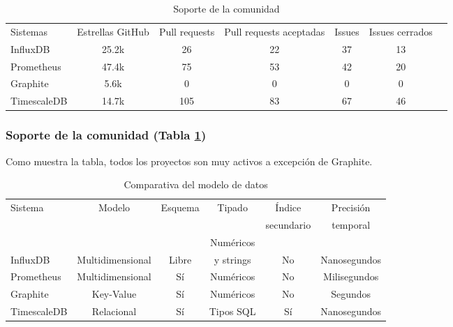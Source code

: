 \begin{table}[H]
    \begin{center}
        \begin{adjustbox}{max width=\textwidth}
            \begin{tabular}{l c c c c c c}
                \toprule
                Sistemas & Estrellas GitHub & Pull requests & Pull requests aceptadas & Issues & Issues cerrados \\
                \otoprule
                InfluxDB    & 25.2k & 26 & 22 & 37 & 13 \\
                Prometheus  & 47.4k & 75 & 53 & 42 & 20\\
                Graphite & 5.6k & 0 & 0 & 0 & 0 \\
                TimescaleDB & 14.7k & 105 & 83 & 67 & 46 \\
                \bottomrule
            \end{tabular}
        \end{adjustbox}
        \caption{Soporte de la comunidad}
        \label{tabla:cssgbd}
    \end{center}
\end{table}

\subsubsection*{Soporte de la comunidad (Tabla \ref*{tabla:cssgbd})} Como muestra la tabla, todos los proyectos son muy
activos a excepción de Graphite.

\begin{table}[H]
    \begin{center}
        \begin{adjustbox}{max width=\textwidth}
            \begin{tabular}{l c c c c c}
                \toprule
                \multirow{2}{*}{Sistema} & \multirow{2}{*}{Modelo} & \multirow{2}{*}{Esquema} & \multirow{2}{*}{Tipado} & Índice & Precisión\\
                &&&& secundario & temporal \\
                \otoprule
                &&& Numéricos && \\
                \multirow{-2}{*}{InfluxDB}    & \multirow{-2}{*}{Multidimensional} & \multirow{-2}{*}{Libre} & y strings & \multirow{-2}{*}{No} & \multirow{-2}{*}{Nanosegundos} \\
                \rowcolor{gray!35}
                Prometheus  & Multidimensional & Sí & Numéricos & No & Milisegundos \\
                Graphite    & Key-Value & Sí & Numéricos & No & Segundos \\
                \rowcolor{gray!35}
                TimescaleDB & Relacional & Sí & Tipos SQL & Sí & Nanosegundos \\
                \bottomrule
            \end{tabular}
        \end{adjustbox}
        \caption{Comparativa del modelo de datos}
        \label{tabla:dmsgbd}
    \end{center}
\end{table}

